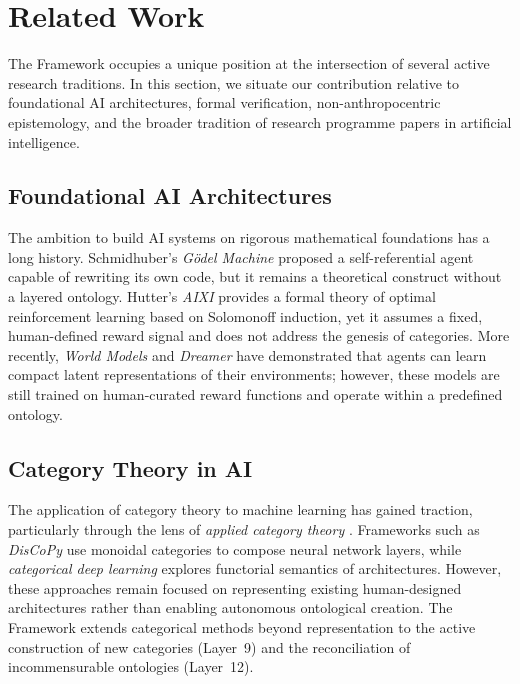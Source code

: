 \section{Related Work}
\label{sec:related}

The \Apeiron{} Framework occupies a unique position at the intersection of several active research traditions. In this section, we situate our contribution relative to foundational AI architectures, formal verification, non-anthropocentric epistemology, and the broader tradition of research programme papers in artificial intelligence.

\subsection{Foundational AI Architectures}
The ambition to build AI systems on rigorous mathematical foundations has a long history. Schmidhuber's \textit{G\"odel Machine} \cite{schmidhuber2007} proposed a self-referential agent capable of rewriting its own code, but it remains a theoretical construct without a layered ontology. Hutter's \textit{AIXI} \cite{hutter2005} provides a formal theory of optimal reinforcement learning based on Solomonoff induction, yet it assumes a fixed, human-defined reward signal and does not address the genesis of categories. More recently, \textit{World Models} \cite{ha2018} and \textit{Dreamer} \cite{hafner2019} have demonstrated that agents can learn compact latent representations of their environments; however, these models are still trained on human-curated reward functions and operate within a predefined ontology.

\subsection{Category Theory in AI}
The application of category theory to machine learning has gained traction, particularly through the lens of \textit{applied category theory} \cite{fong2019}. Frameworks such as \textit{DisCoPy} \cite{delpeuch2021} use monoidal categories to compose neural network layers, while \textit{categorical deep learning} \cite{gavranovic2024} explores functorial semantics of architectures. However, these approaches remain focused on representing existing human-designed architectures rather than enabling autonomous ontological creation. The \Apeiron{} Framework extends categorical methods beyond representation to the active construction of new categories (Layer~9) and the reconciliation of incommensurable ontologies (Layer~12).

